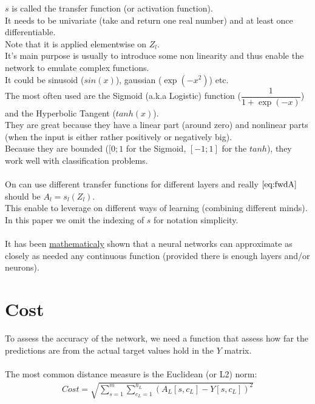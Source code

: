 \documentclass[]{article}
\begin{document}
$s$ is called the transfer function (or activation function).\\
It needs to be univariate (take and return one real number) and at least once differentiable.\\
Note that it is applied elementwise on $Z_l$.\\
It's main purpose is usually to introduce some non linearity and thus enable the network to emulate complex functions.\\
It could be sinusoid ($sin(x)$), gaussian ($\exp(-x^2)$) etc.\\
The most often used are the Sigmoid (a.k.a Logistic) function ($\dfrac{1}{1+\exp(-x)}$) and the Hyperbolic Tangent ($tanh(x)$).\\
They are great because they have a linear part (around zero) and nonlinear parts (when the input is either rather positively or negatively big).\\
Because they are bounded ($[0;1$ for the Sigmoid, $[-1;1]$ for the $tanh$), they work well with classification problems.\\
\\
On can use different transfer functions for different layers and really $\eqref{eq:fwdA}$ should be $A_l=s_l(Z_{l})$.\\
This enable to leverage on different ways of learning (combining different minds).\\
In this paper we omit the indexing of $s$ for notation simplicity.\\
\\
It has been \href{http://www.sciencedirect.com/science/article/pii/0893608089900208}{mathematicaly} shown that a neural networks can approximate as closely as needed any continuous function (provided there is enough layers and/or neurons).\\



\section{Cost}

To assess the accuracy of the network, we need a function that assess how far the predictions are from the actual target values hold in the $Y$ matrix.\\
\\
The most common distance measure is the Euclidean (or L2) norm:\\
\begin{align*}
Cost= \sqrt{ \sum_{s=1}^{m}\sum_{c_L=1}^{h_L}(A_L[s,c_L]-Y[s,c_L])^2 }
\end{align*}
\end{document}
